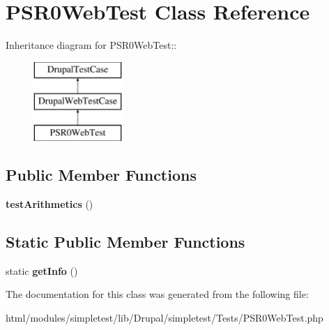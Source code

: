 \hypertarget{classPSR0WebTest}{
\section{PSR0WebTest Class Reference}
\label{classPSR0WebTest}
}
Inheritance diagram for PSR0WebTest::\begin{figure}[H]
\begin{center}
\leavevmode
\includegraphics[height=3cm]{classPSR0WebTest}
\end{center}
\end{figure}
\subsection*{Public Member Functions}
\begin{DoxyCompactItemize}
\item 
\hypertarget{classPSR0WebTest_a799b842fdde3a2b81dcaf79f35e7211f}{
{\bfseries testArithmetics} ()}
\label{classPSR0WebTest_a799b842fdde3a2b81dcaf79f35e7211f}

\end{DoxyCompactItemize}
\subsection*{Static Public Member Functions}
\begin{DoxyCompactItemize}
\item 
\hypertarget{classPSR0WebTest_a64484773fd2212367bd78e032bac7bd6}{
static {\bfseries getInfo} ()}
\label{classPSR0WebTest_a64484773fd2212367bd78e032bac7bd6}

\end{DoxyCompactItemize}


The documentation for this class was generated from the following file:\begin{DoxyCompactItemize}
\item 
html/modules/simpletest/lib/Drupal/simpletest/Tests/PSR0WebTest.php\end{DoxyCompactItemize}
